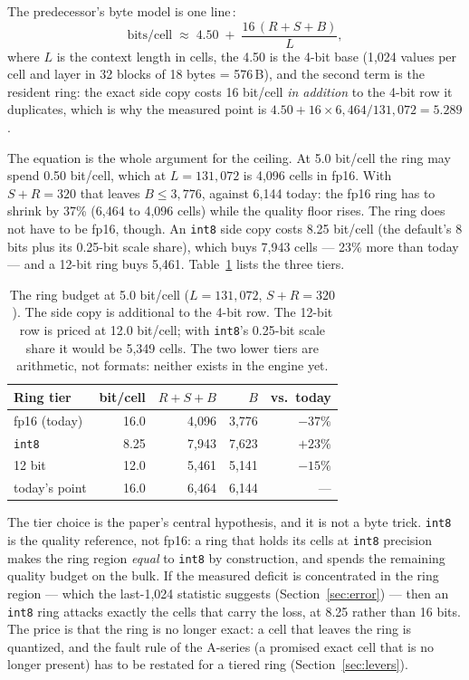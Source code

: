 \documentclass[10pt,twocolumn]{article}
\begin{document}
The predecessor's byte model is one line\,\cite{kvwin}:
\begin{equation}
\text{bits/cell} \;\approx\; 4.50 \;+\; \frac{16\,(R+S+B)}{L},
\label{eq:budget}
\end{equation}
where $L$ is the context length in cells, the 4.50 is the 4-bit base (1,024 values per cell and layer in 32 blocks of 18 bytes = 576\,B), and the second term is the resident ring: the exact side copy costs 16 bit/cell \emph{in addition} to the 4-bit row it duplicates, which is why the measured point is $4.50 + 16\times6{,}464/131{,}072 = 5.289$.

The equation is the whole argument for the ceiling. At 5.0 bit/cell the ring may spend 0.50 bit/cell, which at $L{=}131{,}072$ is 4,096 cells in fp16. With $S{+}R{=}320$ that leaves $B \le 3{,}776$, against 6,144 today: the fp16 ring has to shrink by 37\% (6,464 to 4,096 cells) while the quality floor rises. The ring does not have to be fp16, though. An \texttt{int8} side copy costs 8.25 bit/cell (the default's 8 bits plus its 0.25-bit scale share), which buys 7,943 cells --- 23\% more than today --- and a 12-bit ring buys 5,461. Table~\ref{tab:tiers} lists the three tiers.

\begin{table}[t]
\centering
\footnotesize
\caption{The ring budget at 5.0 bit/cell ($L{=}131{,}072$, $S{+}R{=}320$). The side copy is additional to the 4-bit row. The 12-bit row is priced at 12.0 bit/cell; with \texttt{int8}'s 0.25-bit scale share it would be 5,349 cells. The two lower tiers are arithmetic, not formats: neither exists in the engine yet.}
\label{tab:tiers}
\begin{tabular}{@{}lrrrr@{}}
\toprule
Ring tier & bit/cell & $R{+}S{+}B$ & $B$ & vs.\ today \\
\midrule
fp16 (today) & 16.0 & 4,096 & 3,776 & $-37\%$ \\
\texttt{int8} & 8.25 & 7,943 & 7,623 & $+23\%$ \\
12 bit & 12.0 & 5,461 & 5,141 & $-15\%$ \\
\midrule
today's point & 16.0 & 6,464 & 6,144 & --- \\
\bottomrule
\end{tabular}
\end{table}

The tier choice is the paper's central hypothesis, and it is not a byte trick. \texttt{int8} is the quality reference, not fp16: a ring that holds its cells at \texttt{int8} precision makes the ring region \emph{equal} to \texttt{int8} by construction, and spends the remaining quality budget on the bulk. If the measured deficit is concentrated in the ring region --- which the last-1,024 statistic suggests (Section~\ref{sec:error}) --- then an \texttt{int8} ring attacks exactly the cells that carry the loss, at 8.25 rather than 16 bits. The price is that the ring is no longer exact: a cell that leaves the ring is quantized, and the fault rule of the A-series (a promised exact cell that is no longer present) has to be restated for a tiered ring (Section~\ref{sec:levers}).
\end{document}
